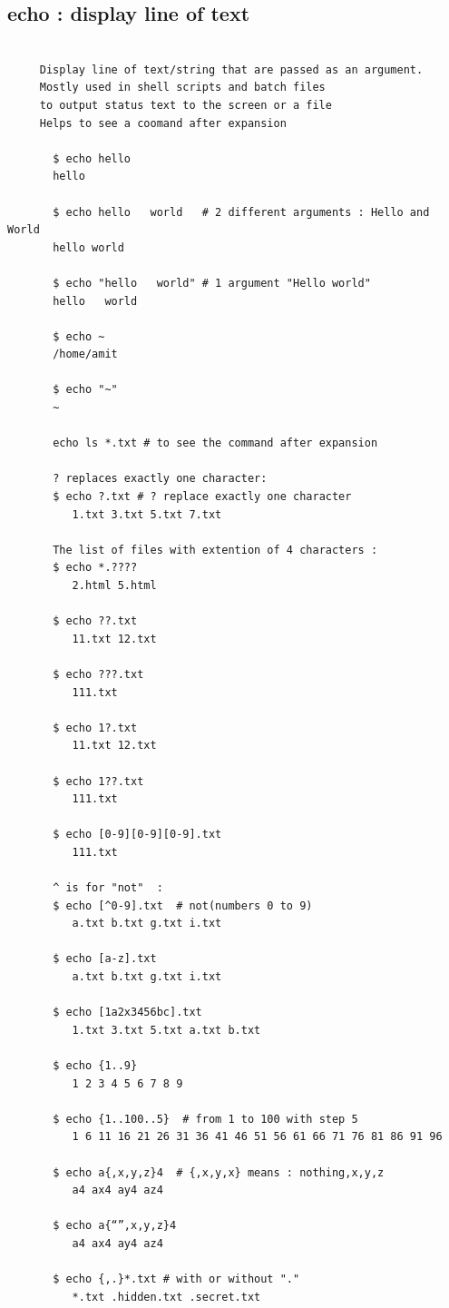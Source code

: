 \documentclass[a4paper,12pt]{article}
\begin{document}
\subsection{echo     : display line of text}
\begin{verbatim}
     
     Display line of text/string that are passed as an argument.
     Mostly used in shell scripts and batch files 
     to output status text to the screen or a file
     Helps to see a coomand after expansion
 
       $ echo hello
       hello
﻿
       $ echo hello   world   # 2 different arguments : Hello and World
       hello world
﻿
       $ echo "hello   world" # 1 argument "Hello world"
       hello   world
﻿
       $ echo ~
       /home/amit

       ﻿$ echo "~"
       ~

       echo ls *.txt # to see the command after expansion

       ? replaces exactly one character:
       $ echo ?.txt # ? replace exactly one character
          1.txt 3.txt 5.txt 7.txt               

       The list of files with extention of 4 characters :
       $ echo *.????
          2.html 5.html

       $ echo ??.txt
          11.txt 12.txt
 
       $ echo ???.txt
          111.txt
﻿
       ﻿$ echo 1?.txt
          11.txt 12.txt
﻿
       $ echo 1??.txt
          111.txt

       $ echo [0-9][0-9][0-9].txt
          111.txt
       
       ^ is for "not"  : 
       $ echo [^0-9].txt  # not(numbers 0 to 9)
          a.txt b.txt g.txt i.txt

       $ echo [a-z].txt
          a.txt b.txt g.txt i.txt

       $ echo [1a2x3456bc].txt
          1.txt 3.txt 5.txt a.txt b.txt

       $ echo {1..9}
          1 2 3 4 5 6 7 8 9

       $ echo {1..100..5}  # from 1 to 100 with step 5
          1 6 11 16 21 26 31 36 41 46 51 56 61 66 71 76 81 86 91 96

       $ echo a{,x,y,z}4  # {,x,y,x} means : nothing,x,y,z
          a4 ax4 ay4 az4

       $ echo a{“”,x,y,z}4
          a4 ax4 ay4 az4

       $ echo {,.}*.txt # with or without "."
          *.txt .hidden.txt .secret.txt
       

\end{verbatim}
\end{document}
